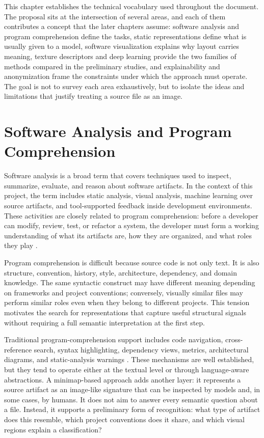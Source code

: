 This chapter establishes the technical vocabulary used throughout the document.
The proposal sits at the intersection of several areas, and each of them
contributes a concept that the later chapters assume: software analysis and
program comprehension define the tasks, static representations define what is
usually given to a model, software visualization explains why layout carries
meaning, texture descriptors and deep learning provide the two families of
methods compared in the preliminary studies, and explainability and
anonymization frame the constraints under which the approach must operate. The
goal is not to survey each area exhaustively, but to isolate the ideas and
limitations that justify treating a source file as an image.

\section{Software Analysis and Program Comprehension}

Software analysis is a broad term that covers techniques used to inspect,
summarize, evaluate, and reason about software artifacts. In the context of this
project, the term includes static analysis, visual analysis, machine learning
over source artifacts, and tool-supported feedback inside development
environments. These activities are closely related to program comprehension:
before a developer can modify, review, test, or refactor a system, the developer
must form a working understanding of what its artifacts are, how they are
organized, and what roles they play \cite{vonmayrhauser1995comprehension}.

Program comprehension is difficult because source code is not only text. It is
also structure, convention, history, style, architecture, dependency, and domain
knowledge. The same syntactic construct may have different meaning depending on
frameworks and project conventions; conversely, visually similar files may
perform similar roles even when they belong to different projects. This tension
motivates the search for representations that capture useful structural signals
without requiring a full semantic interpretation at the first step.

Traditional program-comprehension support includes code navigation,
cross-reference search, syntax highlighting, dependency views, metrics,
architectural diagrams, and static-analysis warnings
\cite{storey2006comprehension}. These mechanisms are well established, but they
tend to operate either at the textual level or through language-aware
abstractions. A minimap-based approach adds another layer: it
represents a source artifact as an image-like signature that can be inspected by
models and, in some cases, by humans. It does not aim to answer every semantic
question about a file. Instead, it supports a preliminary form of recognition:
what type of artifact does this resemble, which project conventions does it
share, and which visual regions explain a classification?

